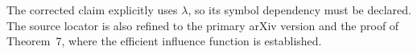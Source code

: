 The corrected claim explicitly uses \(\lambda\), so its symbol dependency must be declared. The source locator is also refined to the primary arXiv version and the proof of Theorem~7, where the efficient influence function is established.